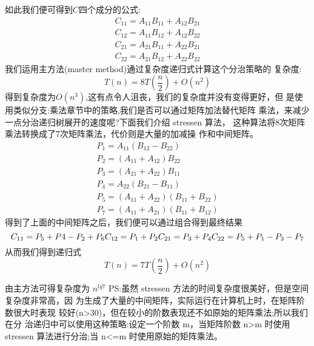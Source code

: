 如此我们便可得到$C$四个成分的公式:
$$
\begin{array}{l}
C_{11}=A_{11} B_{11}+A_{12} B_{21} \\
C_{12}=A_{11} B_{12}+A_{12} B_{22} \\
C_{21}=A_{21} B_{11}+A_{22} B_{21} \\
C_{22}=A_{21} B_{12}+A_{22} B_{22}
\end{array}
$$
我们运用主方法(master method)通过复杂度递归式计算这个分治策略的 复杂度:
$$
T(n)=8 T\left(\frac{n}{2}\right)+O\left(n^{2}\right)
$$
得到复杂度为$O(n^3)$,这有点令人沮丧，我们的复杂度并没有变得更好，但 是使用类似分支:乘法章节中的策略,我们是否可以通过矩阵加法替代矩阵 乘法，来减少一点分治递归树展开的速度呢?下面我们介绍 stressen 算法， 这种算法将8次矩阵乘法转换成了7次矩阵乘法，代价则是大量的加减操 作和中间矩阵。
$$
\begin{array}{c}
P_{1}=A_{11}\left(B_{12}-B_{22}\right) \\
P_{2}=\left(A_{11}+A_{12}\right) B_{22} \\
P_{3}=\left(A_{21}+A_{22}\right) B_{11} \\
P_{4}=A_{22}\left(B_{21}-B_{11}\right) \\
P_{5}=\left(A_{11}+A_{22}\right)\left(B_{11}+B_{22}\right) \\
P_{7}=\left(A_{11}+A_{21}\right)\left(B_{11}+B_{12}\right)
\end{array}
$$
得到了上面的中间矩阵之后，我们便可以通过组合得到最终结果
$$
C_{11}=P_{5}+P 4-P_{2}+P_{6}\\
C_{12}=P_{1}+P_{2} \\
C_{21}=P_{3}+P_{4} \\
C_{22}=P_{5}+P_{1}-P_{3}-P_{7}
$$
从而我们得到递归式
$$
T(n)=7 T\left(\frac{n}{2}\right)+O\left(n^{2}\right)
$$

由主方法可得复杂度为 $n^{lg 7}$
PS:虽然 stressen 方法的时间复杂度很美好，但是空间复杂度非常高，因 为生成了大量的中间矩阵，实际运行在计算机上时，在矩阵阶数很大时表现 较好(n>30)，但在较小的阶数表现还不如原始的矩阵乘法;所以我们在分 治递归中可以使用这种策略:设定一个阶数 m，当矩阵阶数 n>m 时使用 stressen 算法进行分治;当 n<=m 时使用原始的矩阵乘法。
